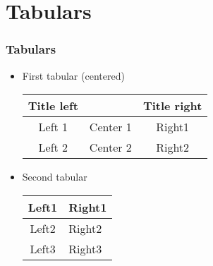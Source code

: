 \documentclass{beamer} 						%
\begin{document}
\section{Tabulars}
\begin{frame}
    \frametitle{Tabulars}

\begin{itemize}
		\item First tabular (centered) \medskip
		
		\begin{tabular}{ccc}
  	    	Title left & & Title right  \\
		 	\hline  	        
  	        Left 1 & Center 1 & Right1  \\
			Left 2 & Center 2 & Right2   
		\end{tabular}
		
	    \item Second tabular \medskip
	    
	    \begin{tabular}{c|l}
	        
	        Left1 & Right1  \\
			\hline	        
	        Left2 & Right2 \\
   	        Left3 & Right3 \\
       	         
	    \end{tabular}
	\end{itemize}
\end{frame}
\end{document}
